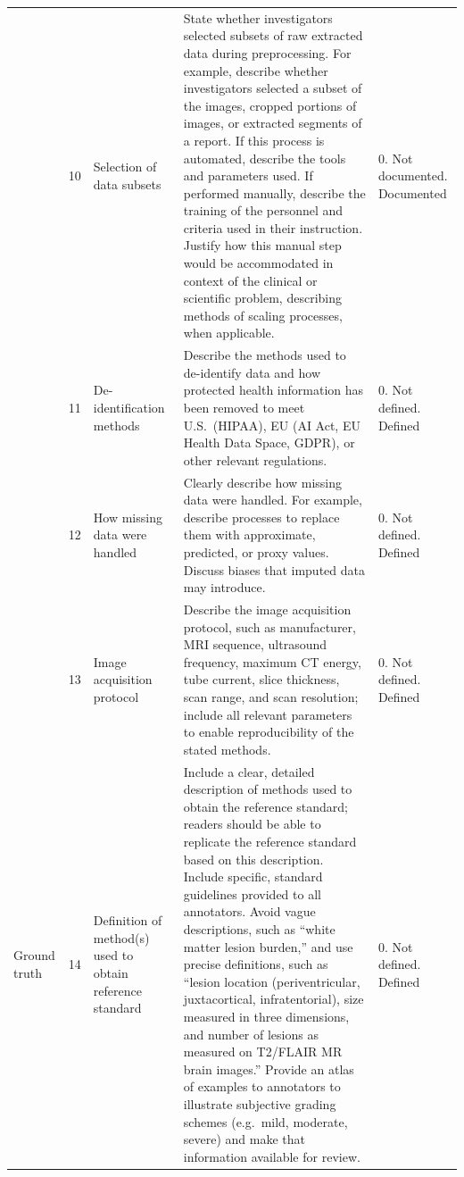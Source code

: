 \begin{landscape}
\begin{longtable}{@{}p{1.7cm}p{0.7cm}p{3.6cm}p{9.6cm}p{3.2cm}@{}}
	\addlinespace
	& 10 & Selection of data subsets & State whether investigators selected subsets of raw extracted data during preprocessing. For example, describe whether investigators selected a subset of the images, cropped portions of images, or extracted segments of a report. If this process is automated, describe the tools and parameters used. If performed manually, describe the training of the personnel and criteria used in their instruction. Justify how this manual step would be accommodated in context of the clinical or scientific problem, describing methods of scaling processes, when applicable. & 0. Not documented\newline 1. Documented \\
	\addlinespace
	& 11 & De-identification methods & Describe the methods used to de-identify data and how protected health information has been removed to meet U.S.\ (HIPAA), EU (AI Act, EU Health Data Space, GDPR), or other relevant regulations. & 0. Not defined\newline 1. Defined \\
	\addlinespace
	& 12 & How missing data were handled & Clearly describe how missing data were handled. For example, describe processes to replace them with approximate, predicted, or proxy values. Discuss biases that imputed data may introduce. & 0. Not defined\newline 1. Defined \\
	\addlinespace
	& 13 & Image acquisition protocol & Describe the image acquisition protocol, such as manufacturer, MRI sequence, ultrasound frequency, maximum CT energy, tube current, slice thickness, scan range, and scan resolution; include all relevant parameters to enable reproducibility of the stated methods. & 0. Not defined\newline 1. Defined \\
	\addlinespace
	Ground truth & 14 & Definition of method(s) used to obtain reference standard & Include a clear, detailed description of methods used to obtain the reference standard; readers should be able to replicate the reference standard based on this description. Include specific, standard guidelines provided to all annotators. Avoid vague descriptions, such as ``white matter lesion burden,'' and use precise definitions, such as ``lesion location (periventricular, juxtacortical, infratentorial), size measured in three dimensions, and number of lesions as measured on T2/FLAIR MR brain images.'' Provide an atlas of examples to annotators to illustrate subjective grading schemes (e.g.\ mild, moderate, severe) and make that information available for review. & 0. Not defined\newline 1. Defined \\

\end{longtable}
\end{landscape}
